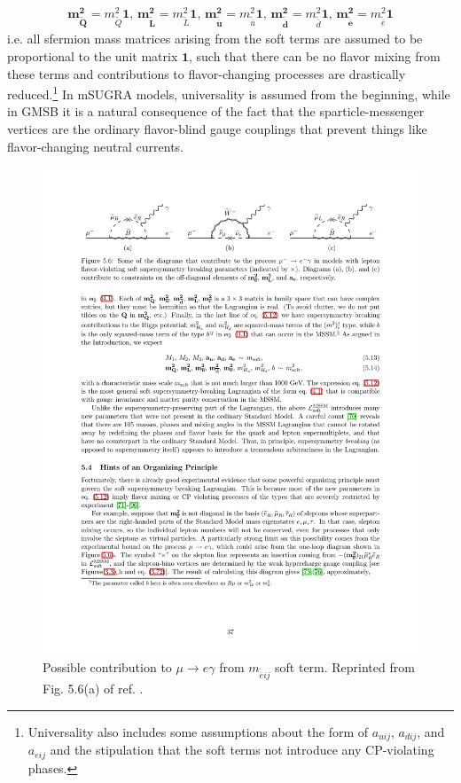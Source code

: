 \documentclass[dissertation.tex]{subfiles}
\begin{document}
\begin{eqnarray}
\label{eq:universailty_conditions}
\mathbf{m_{\widetilde{Q}}^{2}} = m_{\widetilde{Q}}^{2}\mathbf{1}\mbox{, }\mathbf{m_{\widetilde{L}}^{2}} = m_{\widetilde{L}}^{2}\mathbf{1}\mbox{, }\mathbf{m_{\widetilde{\overline{u}}}^{2}} = m_{\widetilde{\overline{u}}}^{2}\mathbf{1}\mbox{, }\mathbf{m_{\widetilde{\overline{d}}}^{2}} = m_{\widetilde{\overline{d}}}^{2}\mathbf{1}\mbox{, }\mathbf{m_{\widetilde{\overline{e}}}^{2}} = m_{\widetilde{\overline{e}}}^{2}\mathbf{1}
\end{eqnarray}
%
i.e. all sfermion mass matrices arising from the soft terms are assumed to be proportional to the unit matrix $\mathbf{1}$, such that there can be no flavor mixing from these terms and contributions to flavor-changing processes are drastically reduced.\footnote{Universality also includes some assumptions about the form of $a_{uij}$, $a_{dij}$, and $a_{eij}$ and the stipulation that the soft terms not introduce any CP-violating phases.}  In mSUGRA models, universality is assumed from the beginning, while in GMSB it is a natural consequence of the fact that the sparticle-messenger vertices are the ordinary flavor-blind gauge couplings that prevent things like flavor-changing neutral currents.

\begin{figure}
	\centering
	\includegraphics[scale=1.0]{muegamma}
	\caption{Possible contribution to $\mu\rightarrow e\gamma$ from $m_{\widetilde{\overline{e}}ij}$ soft term.  Reprinted from Fig. 5.6(a) of ref. \cite{SUSY_primer}.}
	\label{fig:muegamma}
\end{figure}
\end{document}
